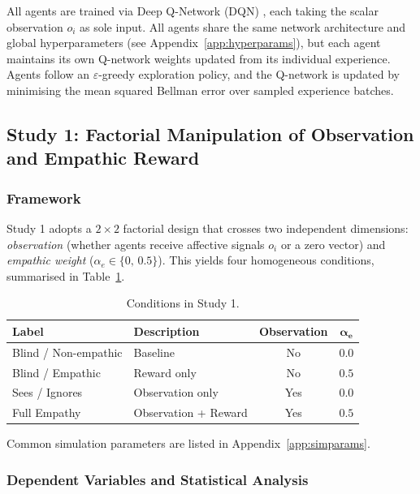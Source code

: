 All agents are trained via Deep Q-Network (DQN) \cite{mnih2015}, each taking the scalar observation $o_i$ as sole input. All agents share the same network architecture and global hyperparameters (see Appendix~\ref{app:hyperparams}), but each agent maintains its own Q-network weights updated from its individual experience. Agents follow an $\varepsilon$-greedy exploration policy, and the Q-network is updated by minimising the mean squared Bellman error over sampled experience batches.

\subsection{Study 1: Factorial Manipulation of Observation and Empathic Reward}

\subsubsection{Framework}

Study 1 adopts a $2\times2$ factorial design that crosses two independent
dimensions: \emph{observation} (whether agents receive affective signals
$o_i$ or a zero vector) and \emph{empathic weight}
($\alpha_e \in \{0,\, 0.5\}$). This yields four homogeneous conditions,
summarised in Table~\ref{tab:conditions}.

\begin{table}[h]
\centering
\begin{tabular}{llcc}
\hline
\textbf{Label} & \textbf{Description} & \textbf{Observation} & $\boldsymbol{\alpha_e}$ \\
\hline
Blind / Non-empathic & Baseline             & No  & $0.0$ \\
Blind / Empathic     & Reward only          & No  & $0.5$ \\
Sees / Ignores       & Observation only     & Yes & $0.0$ \\
Full Empathy         & Observation + Reward & Yes & $0.5$ \\
\hline
\end{tabular}
\caption{Conditions in Study 1.}
\label{tab:conditions}
\end{table}

Common simulation parameters are listed in Appendix~\ref{app:simparams}.

\subsubsection{Dependent Variables and Statistical Analysis}

